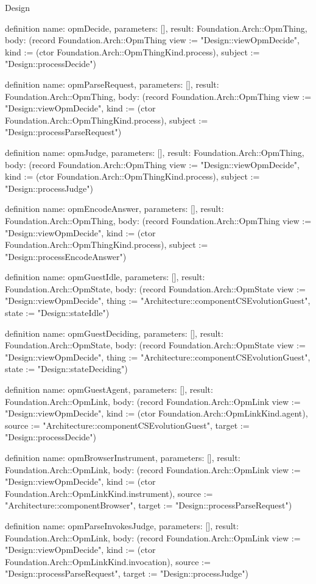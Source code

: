 \begin{lexlean}{Design}
\begin{semanticmodule}
definition{
  name: opmDecide,
  parameters: [],
  result: Foundation.Arch::OpmThing,
  body: (record Foundation.Arch::OpmThing {view := "Design::viewOpmDecide", kind := (ctor Foundation.Arch::OpmThingKind.process), subject := "Design::processDecide"})
}

definition{
  name: opmParseRequest,
  parameters: [],
  result: Foundation.Arch::OpmThing,
  body: (record Foundation.Arch::OpmThing {view := "Design::viewOpmDecide", kind := (ctor Foundation.Arch::OpmThingKind.process), subject := "Design::processParseRequest"})
}

definition{
  name: opmJudge,
  parameters: [],
  result: Foundation.Arch::OpmThing,
  body: (record Foundation.Arch::OpmThing {view := "Design::viewOpmDecide", kind := (ctor Foundation.Arch::OpmThingKind.process), subject := "Design::processJudge"})
}

definition{
  name: opmEncodeAnswer,
  parameters: [],
  result: Foundation.Arch::OpmThing,
  body: (record Foundation.Arch::OpmThing {view := "Design::viewOpmDecide", kind := (ctor Foundation.Arch::OpmThingKind.process), subject := "Design::processEncodeAnswer"})
}

definition{
  name: opmGuestIdle,
  parameters: [],
  result: Foundation.Arch::OpmState,
  body: (record Foundation.Arch::OpmState {view := "Design::viewOpmDecide", thing := "Architecture::componentCSEvolutionGuest", state := "Design::stateIdle"})
}

definition{
  name: opmGuestDeciding,
  parameters: [],
  result: Foundation.Arch::OpmState,
  body: (record Foundation.Arch::OpmState {view := "Design::viewOpmDecide", thing := "Architecture::componentCSEvolutionGuest", state := "Design::stateDeciding"})
}

definition{
  name: opmGuestAgent,
  parameters: [],
  result: Foundation.Arch::OpmLink,
  body: (record Foundation.Arch::OpmLink {view := "Design::viewOpmDecide", kind := (ctor Foundation.Arch::OpmLinkKind.agent), source := "Architecture::componentCSEvolutionGuest", target := "Design::processDecide"})
}

definition{
  name: opmBrowserInstrument,
  parameters: [],
  result: Foundation.Arch::OpmLink,
  body: (record Foundation.Arch::OpmLink {view := "Design::viewOpmDecide", kind := (ctor Foundation.Arch::OpmLinkKind.instrument), source := "Architecture::componentBrowser", target := "Design::processParseRequest"})
}

definition{
  name: opmParseInvokesJudge,
  parameters: [],
  result: Foundation.Arch::OpmLink,
  body: (record Foundation.Arch::OpmLink {view := "Design::viewOpmDecide", kind := (ctor Foundation.Arch::OpmLinkKind.invocation), source := "Design::processParseRequest", target := "Design::processJudge"})
}


\end{semanticmodule}
\end{lexlean}
